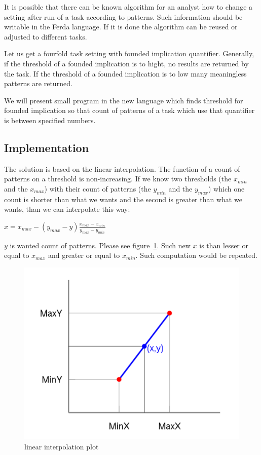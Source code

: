 \documentclass[a4paper,12pt]{book}
\begin{document}
It is possible that there can be known algorithm for an analyst how to change a setting after run of a task according to patterns. Such information should be writable in the Ferda language. If it is done the algorithm can be reused or adjusted to different tasks.

Let us get a fourfold task setting with founded implication quantifier. Generally, if the threshold of a founded implication is to hight, no results are returned by the task. If the threshold of a founded implication is to low many meaningless patterns are returned.

We will present small program in the new language which finds threshold for founded implication so that count of patterns of a task which use that quantifier is between specified numbers.

\subsection{Implementation}
The solution is based on the linear interpolation. The function of a count of patterns on a threshold is non-increasing. If we know two thresholds (the $x_{min}$ and the $x_{max}$) with their count of patterns (the $y_{min}$ and the $y_{max}$) which one count is shorter than what we wants and the second is greater than what we wants, than we can interpolate this way: 

\begin{math}
x = x_{max} - (y_{max} - y)\frac{x_{max} - x_{min}}{y_{max} - y_{min}}
\end{math}

$y$ is wanted count of patterns. Please see figure~\ref{fig:linearInterpolationPlot}. Such new $x$ is than lesser or equal to $x_{max}$ and greater or equal to $x_{min}$. Such computation would be repeated.

\begin{figure}
	\includegraphics[width=1\textwidth]{linearInterpolationPlot}
	\caption{linear interpolation plot}
	\label{fig:linearInterpolationPlot}
\end{figure}
\end{document}
